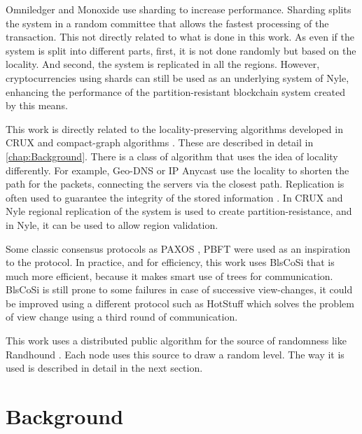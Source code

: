 \documentclass[a4paper,11pt,oneside]{report}
\begin{document}
Omniledger \cite{Kokoris-Kogias2017} and Monoxide \cite{Wang2019} use sharding
to increase performance. Sharding splits the system in a random committee that
allows the fastest processing of the transaction. This not directly related to
what is done in this work. As even if the system is split into different parts,
first, it is not done randomly but based on the locality. And second, the system is replicated
in all the regions. However, cryptocurrencies using shards can still be used as
an underlying system of Nyle, enhancing the performance of the
partition-resistant blockchain system created by this means.

This work is directly related to the locality-preserving algorithms developed
in CRUX \cite{Basescu2014} and compact-graph algorithms \cite{Thorup2005}.
These are described in detail in \autoref{chap:Background}. There is a class of
algorithm that uses the idea of locality differently. For example, Geo-DNS
\cite{Katz-bassett2006} or IP Anycast \cite{Abley2006} use the locality to
shorten the path for the packets, connecting the servers via the closest path.
Replication is often used to guarantee the integrity of the stored information
\cite{Mokadem2015}. In CRUX \cite{Basescu2014} and Nyle regional replication of
the system is used to create partition-resistance, and in Nyle, it can be used
to allow region validation.

Some classic consensus protocols as PAXOS \cite{Lamport2000}, PBFT
\cite{Castro1999} were used as an inspiration to the protocol. In practice, and
for efficiency, this work uses BlsCoSi \cite{Boneh2018} that is much more
efficient, because it makes smart use of trees for communication. BlsCoSi
\cite{Boneh2018} is still prone to some failures in case of successive
view-changes, it could be improved using a different protocol such as HotStuff
\cite{Yin2018} which solves the problem of view change using a third round of
communication. 

This work uses a distributed public algorithm for the source of randomness like
Randhound \cite{Syta2016}. Each node uses this source to draw a random
level. The way it is used is described in detail in the next section. 


\chapter{Background} \label{chap:Background} %
\end{document}
